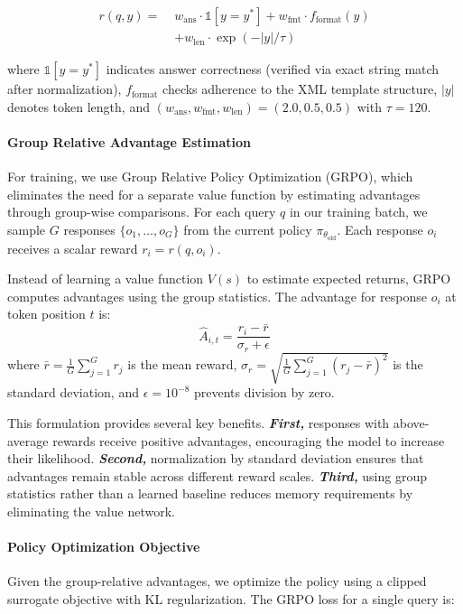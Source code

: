 \documentclass[11pt]{article}
\begin{document}
\vspace{-1.5em}

\begin{align*}
r(q, y) =\;& 
    w_{\text{ans}} \cdot \mathbb{1}[y = y^*] 
    + w_{\text{fmt}} \cdot f_{\text{format}}(y) \nonumber \\
    &+ w_{\text{len}} \cdot \exp(-|y|/\tau)
\end{align*}

where $\mathbb{1}[y = y^*]$ indicates answer correctness (verified via exact string match after normalization), $f_{\text{format}}$ checks adherence to the XML template structure, $|y|$ denotes token length, and $(w_{\text{ans}}, w_{\text{fmt}}, w_{\text{len}}) = (2.0, 0.5, 0.5)$ with $\tau = 120$.

\paragraph{Group Relative Advantage Estimation} For training, we use Group Relative Policy Optimization (GRPO), which eliminates the need for a separate value function by estimating advantages through group-wise comparisons. For each query $q$ in our training batch, we sample $G$ responses $\{o_1, \ldots, o_G\}$ from the current policy $\pi_{\theta_{\text{old}}}$. Each response $o_i$ receives a scalar reward $r_i = r(q, o_i)$.

Instead of learning a value function $V(s)$ to estimate expected returns, GRPO computes advantages using the group statistics. The advantage for response $o_i$ at token position $t$ is:
$$\hat{A}_{i,t} = \frac{r_i - \bar{r}}{\sigma_r + \epsilon}$$
where $\bar{r} = \frac{1}{G}\sum_{j=1}^{G} r_j$ is the mean reward, $\sigma_r = \sqrt{\frac{1}{G}\sum_{j=1}^{G}(r_j - \bar{r})^2}$ is the standard deviation, and $\epsilon = 10^{-8}$ prevents division by zero.

This formulation provides several key benefits. \textbf{\textit{First,}} responses with above-average rewards receive positive advantages, encouraging the model to increase their likelihood. \textbf{\textit{Second,}} normalization by standard deviation ensures that advantages remain stable across different reward scales. \textbf{\textit{Third,}} using group statistics rather than a learned baseline reduces memory requirements by eliminating the value network.

\paragraph{Policy Optimization Objective} Given the group-relative advantages, we optimize the policy using a clipped surrogate objective with KL regularization. The GRPO loss for a single query is:
\end{document}
